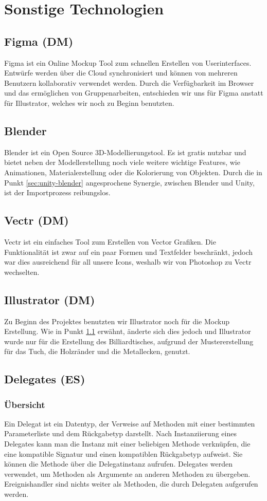 \section{Sonstige Technologien}
\subsection{Figma (DM)} \label{sec:figma}
Figma ist ein Online Mockup Tool zum schnellen Erstellen von Userinterfaces. Entwürfe werden über die Cloud synchronisiert und können von mehreren Benutzern kollaborativ verwendet werden. Durch die Verfügbarkeit im Browser und das ermöglichen von Gruppenarbeiten, entschieden wir uns für Figma anstatt für Illustrator, welches wir noch zu Beginn benutzten.
\subsection{Blender}
Blender ist ein Open Source 3D-Modellierungstool. Es ist gratis nutzbar und bietet neben der Modellerstellung noch viele weitere wichtige Features, wie Animationen, Materialerstellung oder die Kolorierung von Objekten. Durch die in Punkt \ref{sec:unity-blender} angesprochene Synergie, zwischen Blender und Unity, ist der Importprozess reibungslos.
\subsection{Vectr (DM)}
Vectr ist ein einfaches Tool zum Erstellen von Vector Grafiken. Die Funktionalität ist zwar auf ein paar Formen und Textfelder beschränkt, jedoch war dies ausreichend für all unsere Icons, weshalb wir von Photoshop zu Vectr wechselten.
\subsection{Illustrator (DM)}
Zu Beginn des Projektes benutzten wir Illustrator noch für die Mockup Erstellung. Wie in Punkt \ref{sec:figma} erwähnt, änderte sich dies jedoch und Illustrator wurde nur für die Erstellung des Billiardtisches, aufgrund der Mustererstellung für das Tuch, die Holzränder und die Metallecken, genutzt.
\subsection{Delegates (ES)}
\subsubsection{Übersicht}
Ein Delegat ist ein Datentyp, der Verweise auf Methoden mit einer bestimmten Parameterliste und dem Rückgabetyp darstellt. Nach Instanziierung eines Delegates kann man die Instanz mit einer beliebigen Methode verknüpfen, die eine kompatible Signatur und einen kompatiblen Rückgabetyp aufweist. Sie können die Methode über die Delegatinstanz aufrufen.
Delegates werden verwendet, um Methoden als Argumente an anderen Methoden zu übergeben. Ereignishandler sind nichts weiter als Methoden, die durch Delegaten aufgerufen werden.
